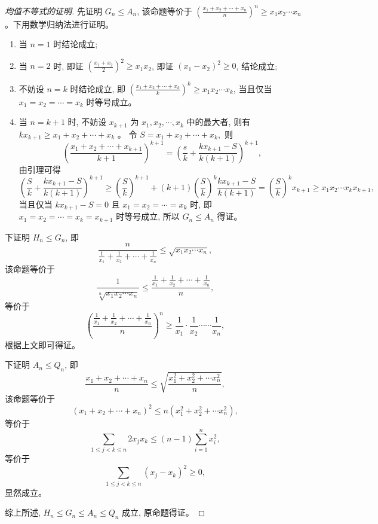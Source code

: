 \begin{proof}[均值不等式的证明]
  先证明 $G_{n} \leq A_{n}$, 该命题等价于 $\left(\frac{x_{1}+x_{2}+\cdots+x_{n}}{n}\right)^{n} \geq x_{1} x_{2} \cdots x_{n}$ 。下用数学归纳法进行证明。
  \begin{enumerate}
    \item 当 $n=1$ 时结论成立;
    \item 当 $n=2$ 时, 即证 $\left(\frac{x_{1}+x_{2}}{2}\right)^{2} \geq x_{1} x_{2}$, 即证 $\left(x_{1}-x_{2}\right)^{2} \geq 0$, 结论成立;
    \item 不妨设 $n=k$ 时结论成立, 即 $\left(\frac{x_{1}+x_{2}+\cdots+x_{k}}{k}\right)^{k} \geq x_{1} x_{2} \cdots x_{k}$, 当且仅当 $x_{1}=x_{2}=\cdots=x_{k}$ 时等号成立。
    \item 当 $n=k+1$ 时, 不妨设 $x_{k+1}$ 为 $x_{1}, x_{2}, \cdots, x_{k}$ 中的最大者, 则有 $k x_{k+1} \geq x_{1}+x_{2}+\cdots+x_{k}$ 。 令 $S=x_{1}+x_{2}+\cdots+x_{k},$ 则 
    \[
      \left(\frac{x_{1}+x_{2}+\cdots+x_{k+1}}{k+1}\right)^{k+1}=\left(\frac{s}{k}+\right. \left.\frac{k x_{k+1}-S}{k(k+1)}\right)^{k+1},
    \] 由引理可得 
    \[
      \left(\frac{S}{k}+\frac{k x_{k+1}-S}{k(k+1)}\right)^{k+1} \geq\left(\frac{S}{k}\right)^{k+1}+(k+1)\left(\frac{S}{k}\right)^{k} \frac{k x_{k+1}-S}{k(k+1)} = \left(\frac{S}{k}\right)^{k} x_{k+1} \geq x_{1} x_{2} \cdots x_{k} x_{k+1}, 
    \]
    当且仅当 $k x_{k+1}-S=0$ 且 $x_{1}=x_{2}=\cdots=x_{k}$ 时, 即 $x_{1}=x_{2}=\cdots=x_{k}=x_{k+1}$ 时等号成立, 所以 $G_{n} \leq A_{n}$ 得证。
  \end{enumerate}

  下证明 $H_{n} \leq G_{n}$, 即 \[\frac{n}{\frac{1}{x_{1}}+\frac{1}{x_{2}}+\cdots+\frac{1}{x_{n}}} \leq \sqrt{x_{1} x_{2} \cdots x_{n}},\] 该命题等价于 \[\frac{1}{\sqrt[n]{x_{1} x_{2} \cdots x_{n}}} \leq \frac{\frac{1}{x_{1}}+\frac{1}{x_{2}}+\cdots+\frac{1}{x_{n}}}{n},\] 等价于 \[\left(\frac{\frac{1}{x_{1}}+\frac{1}{x_{2}}+\cdots+\frac{1}{x_{n}}}{n}\right)^{n} \geq \frac{1}{x_{1}} \cdot \frac{1}{x_{2}} \cdots \cdots \frac{1}{x_{n}},\]根据上文即可得证。 
  
  下证明 $A_{n} \leq Q_{n}$, 即 \[\frac{x_{1}+x_{2}+\cdots+x_{n}}{n} \leq \sqrt{\frac{x_{1}^{2}+x_{2}^{2}+\cdots x_{n}^{2}}{n}},\] 该命题等价于 \[\left(x_{1}+x_{2}+\cdots+x_{n}\right)^{2} \leq n\left(x_{1}^{2}+x_{2}^{2}+\cdots x_{n}^{2}\right),\] 等价于 \[\sum_{1 \leq j<k \leq n} 2 x_{j} x_{k} \leq(n-1) \sum_{i=1}^{n} x_{i}^{2},\] 等价于 \[\sum_{1 \leq j<k \leq n}\left(x_{j}-x_{k}\right)^{2} \geq 0,\]显然成立。

  综上所述, $H_{n} \leq G_{n} \leq A_{n} \leq Q_{n}$ 成立, 原命题得证。
\end{proof}


